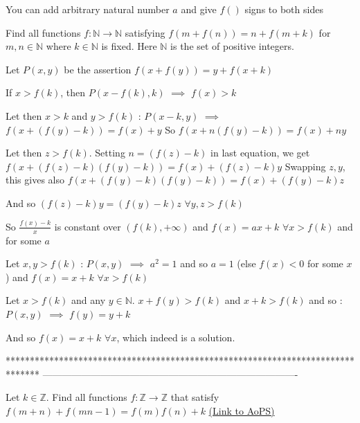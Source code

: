 \begin{solution}
	You can add arbitrary natural number $a$ and give $f()$ signs to both sides
\end{solution}



\begin{solution}
	\begin{tcolorbox}Find all functions $ f: \mathbb{N}\rightarrow\mathbb{N} $ satisfying $ f(m+f(n))=n+f(m+k) $ for $ m,n \in\mathbb{N} $ where $ k\in\mathbb{N} $ is fixed. 
Here $ \mathbb{N} $ is the set of positive integers.\end{tcolorbox}
Let $P(x,y)$ be the assertion $f(x+f(y))=y+f(x+k)$

If $x>f(k)$, then $P(x-f(k),k)$ $\implies$ $f(x)>k$

Let then $x>k$ and $y>f(k)$  : $P(x-k,y)$ $\implies$ $f(x+(f(y)-k))=f(x)+y$
So $f(x+n(f(y)-k))=f(x)+ny$

Let then $z>f(k)$. Setting $n=(f(z)-k)$ in last equation, we get $f(x+(f(z)-k)(f(y)-k))=f(x)+(f(z)-k)y$
Swapping $z,y$, this gives also $f(x+(f(y)-k)(f(y)-k))=f(x)+(f(y)-k)z$

And so $(f(z)-k)y=(f(y)-k)z$ $\forall y,z>f(k)$

So $\frac{f(x)-k}x$ is constant over $(f(k),+\infty)$ and $f(x)=ax+k$ $\forall x>f(k)$ and for some $a$

Let $x,y>f(k)$ : $P(x,y)$ $\implies$ $a^2=1$ and so $a=1$ (else $f(x)<0$ for some $x$) and $f(x)=x+k$ $\forall x>f(k)$

Let $x>f(k)$ and any $y\in\mathbb N$. $x+f(y)>f(k)$ and $x+k>f(k)$ and so : $P(x,y)$ $\implies$ $f(y)=y+k$

And so $\boxed{f(x)=x+k}$ $\forall x$, which indeed is a solution.
\end{solution}
*******************************************************************************
-------------------------------------------------------------------------------

\begin{problem}
	Let $ k\in\mathbb{Z} $. Find all functions $ f: \mathbb{Z}\rightarrow\mathbb{Z} $ that satisfy $ f(m+n)+f(mn-1)=f(m)f(n)+k $
	\flushright \href{https://artofproblemsolving.com/community/c6h536881}{(Link to AoPS)}
\end{problem}



